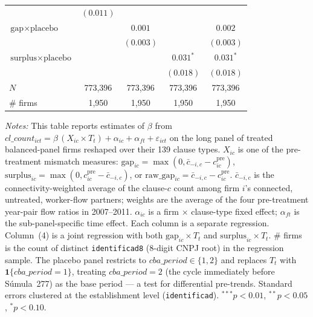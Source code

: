 \begin{table}[H]
\begin{tabular}{lcccc}
 & $(0.011)$ &  &  &  \\
$\text{gap} \times \text{placebo}$ &  & $0.001$ &  & $0.002$ \\
 &  & $(0.003)$ &  & $(0.003)$ \\
$\text{surplus} \times \text{placebo}$ &  &  & $0.031^{*}$ & $0.031^{*}$ \\
 &  &  & $(0.018)$ & $(0.018)$ \\
$N$ & 773,396 & 773,396 & 773,396 & 773,396 \\
\# firms & 1,950 & 1,950 & 1,950 & 1,950 \\
\bottomrule
\end{tabular}
\begin{minipage}{\linewidth}
\footnotesize\vspace{4pt}
\textit{Notes:} This table reports estimates of $\beta$ from $cl\_count_{ict} = \beta\,(X_{ic} \times T_t) + \alpha_{ic} + \alpha_{ft} + \varepsilon_{ict}$ on the long panel of treated balanced-panel firms reshaped over their 139 clause types. $X_{ic}$ is one of the pre-treatment mismatch measures: $\text{gap}_{ic} = \max(0, \bar{c}_{-i,c} - c^{\text{pre}}_{ic})$, $\text{surplus}_{ic} = \max(0, c^{\text{pre}}_{ic} - \bar{c}_{-i,c})$, or $\text{raw\_gap}_{ic} = \bar{c}_{-i,c} - c^{\text{pre}}_{ic}$. $\bar{c}_{-i,c}$ is the connectivity-weighted average of the clause-$c$ count among firm $i$'s connected, untreated, worker-flow partners; weights are the average of the four pre-treatment year-pair flow ratios in 2007--2011. $\alpha_{ic}$ is a firm $\times$ clause-type fixed effect; $\alpha_{ft}$ is the sub-panel-specific time effect. Each column is a separate regression. Column~(4) is a joint regression with both $\text{gap}_{ic} \times T_t$ and $\text{surplus}_{ic} \times T_t$. \# firms is the count of distinct \texttt{identificad8} (8-digit CNPJ root) in the regression sample. The placebo panel restricts to $cba\_period \in \{1, 2\}$ and replaces $T_t$ with $\mathbf{1}\{cba\_period = 1\}$, treating $cba\_period = 2$ (the cycle immediately before Súmula~277) as the base period — a test for differential pre-trends. Standard errors clustered at the establishment level (\texttt{identificad}). $^{***}p<0.01$, $^{**}p<0.05$, $^{*}p<0.10$.
\end{minipage}
\end{table}
